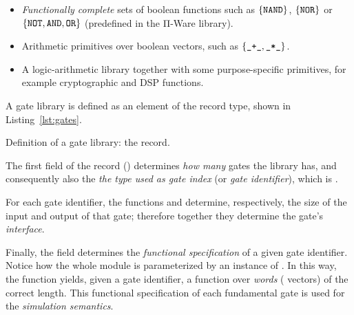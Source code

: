             \begin{itemize}
                \item \emph{Functionally complete} sets of boolean functions such as
                    $\{ \text{\texttt{NAND}} \}$, $\{ \text{\texttt{NOR}} \}$ or
                    $\{ \text{\texttt{NOT}}, \text{\texttt{AND}}, \text{\texttt{OR}} \}$
                    (predefined in the Π-Ware library).
                \item Arithmetic primitives over boolean vectors, such as $\{ \text{\texttt{\_+\_}}, \text{\texttt{\_*\_}} \}$.
                \item A logic-arithmetic library together with some purpose-specific primitives,
                    for example cryptographic and \ac{DSP} functions.
            \end{itemize}

            A gate library is defined as an element of the  record type, shown in Listing~\ref{lst:gates}.

            \begin{listing}[ht]
                \newline
                \caption{Definition of a gate library: the  record.\label{lst:gates}}
            \end{listing}

            The first field of the  record () determines \emph{how many}
            gates the library has, and consequently also the \emph{the type used as gate index}
            (or \emph{gate identifier}), which is  \AY{=}  .

            For each gate identifier, the functions  and  determine, respectively,
            the size of the input and output of that gate; therefore together they determine the gate's \emph{interface}.

            Finally, the  field determines the \emph{functional specification} of a given gate identifier.
            Notice how the whole  module is parameterized by an instance of .
            In this way, the  function yields, given a gate identifier, a function over \emph{words}
            ( vectors) of the correct length.
            This functional specification of each fundamental gate is used for the \emph{simulation semantics}.

